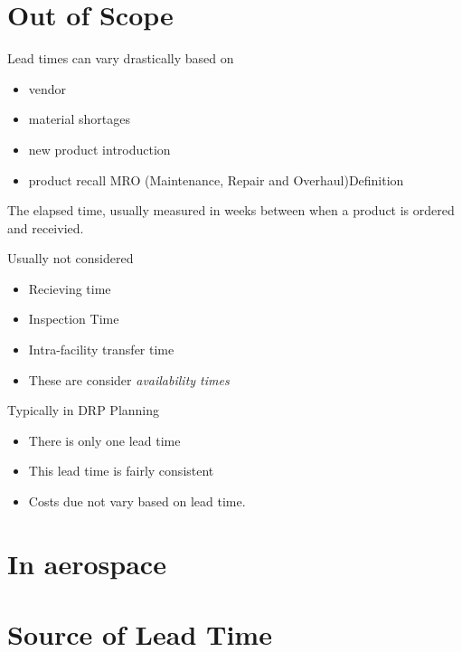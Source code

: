 \documentclass[letterpaper,10pt,english]{sphinxmanual}
\begin{document}
\section{Out of Scope}
\label{Portal/750-Requisitions:out-of-scope}
Lead times can vary drastically based on
\begin{itemize}
\item {} 
vendor

\item {} 
material shortages

\item {} 
new product introduction

\item {} 
product recall MRO (Maintenance, Repair and Overhaul)Definition

\end{itemize}

The elapsed time, usually measured in weeks between when a product
is ordered and receivied.

Usually not considered
\begin{itemize}
\item {} 
Recieving time

\item {} 
Inspection Time

\item {} 
Intra-facility transfer time

\item {} 
These are consider \emph{availability times}

\end{itemize}

Typically in DRP Planning
\begin{itemize}
\item {} 
There is only one lead time

\item {} 
This lead time is fairly consistent

\item {} 
Costs due not vary based on lead time.

\end{itemize}


\section{In aerospace}
\label{Portal/750-Requisitions:in-aerospace}

\section{Source of Lead Time}
\label{Portal/750-Requisitions:source-of-lead-time}
\end{document}

